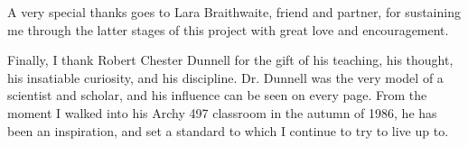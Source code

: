 \vskip 0.5cm

A very special thanks goes to Lara Braithwaite, friend and partner, for sustaining me through the latter stages of this project with great love and encouragement.  
\vskip 0.5cm

Finally, I thank Robert Chester Dunnell for the gift of his teaching, his thought, his insatiable curiosity, and his discipline.  Dr. Dunnell was the very model of a scientist and scholar, and his influence can be seen on every page.  From the moment I walked into his Archy 497 classroom in the autumn of 1986, he has been an inspiration, and set a standard to which I continue to try to live up to.  








% 



\newpage
%